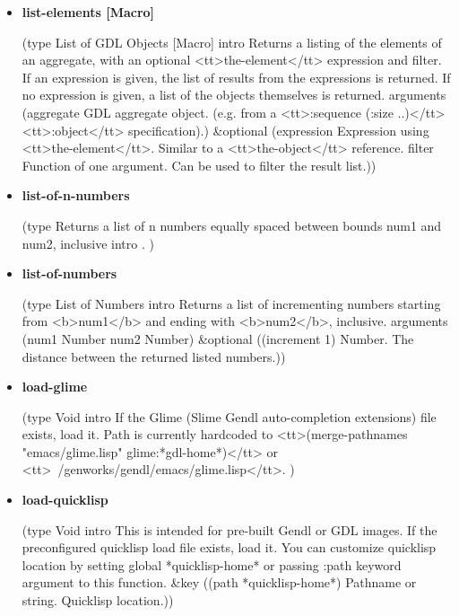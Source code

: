 \documentclass [11pt]{book}
\begin{document}
\begin{itemize}
\item {}
\label{prim:list-elements}
\textbf{list-elements [Macro]}

(type List of GDL Objects [Macro] intro
  Returns a listing of the elements of an aggregate,
with an optional <tt>the-element</tt> expression and filter. If an expression is given,
the list of results from the expressions is returned. If no expression is given, a list
of the objects themselves is returned.
 arguments
 (aggregate
  GDL aggregate object. (e.g. from a <tt>:sequence (:size ..)</tt> <tt>:object</tt> specification).)
 \&optional
 (expression
  Expression using <tt>the-element</tt>. Similar to a <tt>the-object</tt> reference.
  filter
  Function of one argument. Can be used to filter the result list.))



\item {}
\label{prim:list-of-n-numbers}
\textbf{list-of-n-numbers}

(type
 Returns a list of n numbers equally spaced between bounds num1 and num2, inclusive
 intro .
)



\item {}
\label{prim:list-of-numbers}
\textbf{list-of-numbers}

(type List of Numbers intro
  Returns a list of incrementing numbers starting from
<b>num1</b> and ending with <b>num2</b>, inclusive.
 arguments (num1 Number num2 Number) \&optional
 ((increment 1)
  Number. The distance between the returned listed numbers.))



\item {}
\label{prim:load-glime}
\textbf{load-glime}

(type Void intro
   If the Glime (Slime Gendl auto-completion extensions) file exists, load it.
Path is currently hardcoded to <tt>(merge-pathnames "emacs/glime.lisp" glime:*gdl-home*)</tt>
or <tt>~/genworks/gendl/emacs/glime.lisp</tt>.
)



\item {}
\label{prim:load-quicklisp}
\textbf{load-quicklisp}

(type Void intro
  This is intended for pre-built Gendl or GDL images. If the
preconfigured quicklisp load file exists, load it. You can customize
quicklisp location by setting global *quicklisp-home* or passing :path
keyword argument to this function.
 \&key ((path *quicklisp-home*) Pathname or string. Quicklisp location.))




\end{itemize}
\end{document}
